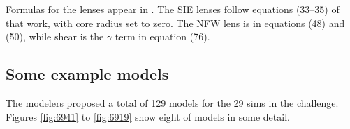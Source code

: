 \documentclass[12pt,preprint]{aastex}
\begin{document}
Formulas for the lenses appear in \cite{2001astro.ph..2341K}. The SIE
lenses follow equations (33--35) of that work, with core radius set to
zero.  The NFW lens is in equations (48) and (50), while shear is the
$\gamma$ term in equation (76).

\subsection{Some example models} \label{sec:example_models}

The modelers proposed a total of 129 models for the 29 sims in the
challenge.  Figures \ref{fig:6941} to \ref{fig:6919} show eight of
models in some detail.

\begin{figure}
  \centering
\end{figure}
\end{document}
